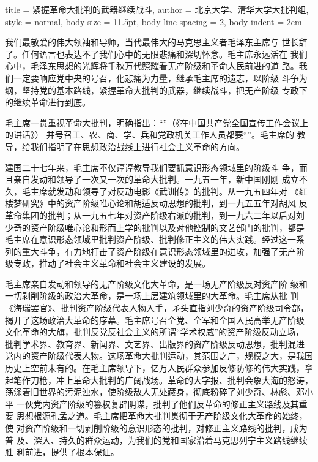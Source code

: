 \begin{hongqiarticle}{
        title  = {紧握革命大批判的武器继续战斗},
        author = {北京大学、清华大学大批判组},
        style  = normal,
        body-size = 11.5pt,
        body-line-spacing = 2,
        body-indent = 2em
    }
    
    我们最敬爱的伟大领袖和导师，当代最伟大的马克思主义者毛泽东主席与
    世长辞了。任何语言也表达不了我们心中的无限悲痛和深切怀念。毛主席永远活在
    我们心中，毛泽东思想的光辉将千秋万代照耀看无产阶级和革命人民前进的道
    路。我们一定要响应党中央的号召，化悲痛为力量，继承毛主席的遗志，以阶级
    斗争为纲，坚持党的基本路线，紧握革命大批判的武器，继续战斗，把无产阶级
    专政下的继续革命进行到底。
    
    毛主席一贯重视革命大批判，明确指出：“”（《在中国共产党全国宣传工作会议上的讲话》）
    并号召工、农、商、学、兵和党政机关工作人员都要“”。毛主席的
    教导，给我们指明了在思想政治战线上进行社会主义革命的方向。
    
    建国二十七年来，毛主席不仅谆谆教导我们要抓意识形态领域里的阶级斗
    争，而且亲自发动和领导了一次又一次的革命大批判。一九五一年，新中国刚刚
    成立不久，毛主席就发动和领导了对反动电影《武训传》的批判。从一九五四年对
    《红楼梦研究》中的资产阶级唯心论和胡适反动思想的批判，到一九五五年对胡风
    反革命集团的批判；从一九五七年对资产阶级右派的批判，到一九六二年以后对刘
    少奇的资产阶级唯心论和形而上学的批判以及对他控制的文艺部门的批判，都是
    毛主席在意识形态领域里批判资产阶级、批判修正主义的伟大实践。经过这一系
    列的重大斗争，有力地打击了资产阶级在意识形态领域里的进攻，加强了无产阶
    级专政，推动了社会主义革命和社会主义建设的发展。
    
    毛主席亲自发动和领导的无产阶级文化大革命，是一场无产阶级反对资产阶
    级和一切剥削阶级的政治大革命，是一场上层建筑领域里的大革命。毛主席从批
    判《海瑞罢官》、批判资产阶级代表人物入手，矛头直指刘少奇的资产阶级司令部，
    揭开了这场政治大革命的序幕。毛主席号召全党、全军和全国人民高举无产阶级
    文化革命的大旗，批判反党反社会主义的所谓“学术权威”的资产阶级反动立场，
    批判学术界、教育界、新闻界、文艺界、出版界的资产阶级反动思想，批判混进
    党内的资产阶级代表人物。这场革命大批判运动，其范围之广，规模之大，是我国
    历史上空前未有的。在毛主席领导下，亿万人民群众参加反修防修的伟大实践，拿
    起笔作刀枪，冲上革命大批判的广阔战场。革命的大字报、批判会象大海的怒涛，
    荡涤着旧世界的污泥浊水，使阶级敌人无处藏身，彻底粉碎了刘少奇、林彪、邓小平
    一伙党内资产阶级的篡权复辟阴谋，批判了他们反革命的修正主义路线及其重要
    思想根源孔孟之道。毛主席把革命大批判贯彻于无产阶级文化大革命的始终，使
    对资产阶级和一切剥削阶级的意识形态的批判，对修正主义路线的批判，成为普
    及、深入、持久的群众运动，为我们的党和国家沿着马克思列宁主义路线继续胜
    利前进，提供了根本保证。
    

\end{hongqiarticle}
